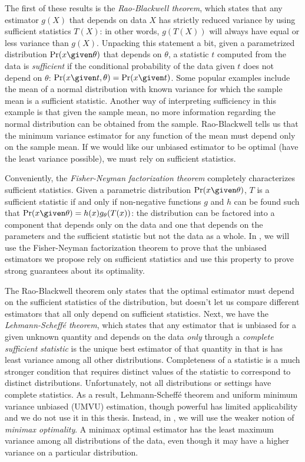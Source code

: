 The first of these results is the \textit{Rao-Blackwell theorem}, which states that any estimator $g(X)$ that depends on data $X$ has strictly reduced variance by using sufficient statistics $T(X)$: in other words, $g(T(X))$ will always have equal or less variance than $g(X)$.
Unpacking this statement a bit, given a parametrized distribution $\Pr(x \given \theta)$ that depends on $\theta$, a statistic $t$ computed from the data is \textit{sufficient} if the conditional probability of the data given $t$ does not depend on $\theta$: $\Pr(x \given t, \theta) = \Pr(x \given t)$.
Some popular examples include the mean of a normal distribution with known variance for which the sample mean is a sufficient statistic.
Another way of interpreting sufficiency in this example is that given the sample mean, no more information regarding the normal distribution can be obtained from the sample. 
Rao-Blackwell tells us that the minimum variance estimator for any function of the mean must depend only on the sample mean.
If we would like our unbiased estimator to be optimal (have the least variance possible), we must rely on sufficient statistics.

Conveniently, the \textit{Fisher-Neyman factorization theorem} completely characterizes sufficient statistics.
Given a parametric distribution $\Pr(x \given \theta)$, $T$ is a sufficient statistic if and only if non-negative functions $g$ and $h$ can be found such that $\Pr(x \given \theta) = h(x) g_\theta(T(x))$:
  the distribution can be factored into a component that depends only on the data and one that depends on the parameters and the sufficient statistic but not the data as a whole.
In , we will use the Fisher-Neyman factorization theorem to prove that the unbiased estimators we propose rely on sufficient statistics and use this property to prove strong guarantees about its optimality.

The Rao-Blackwell theorem only states that the optimal estimator must depend on the sufficient statistics of the distribution, but doesn't let us compare different estimators that all only depend on sufficient statistics.
Next, we have the \textit{Lehmann-Scheff\'{e} theorem}, which states that any estimator that is unbiased for a given unknown quantity and depends on the data \textit{only} through a \textit{complete sufficient statistic} is the unique best estimator of that quantity in that is has least variance among all other distributions.
Completeness of a statistic is a much stronger condition that requires distinct values of the statistic to correspond to distinct distributions.
Unfortunately, not all distributions or settings have complete statistics.
As a result, Lehmann-Scheff\'{e} theorem and uniform minimum variance unbiased (UMVU) estimation, though powerful has limited applicability and we do not use it in this thesis.
Instead, in , we will use the weaker notion of \textit{minimax optimality}.
A minimax optimal estimator has the least maximum variance among all distributions of the data, even though it may have a higher variance on a particular distribution.

